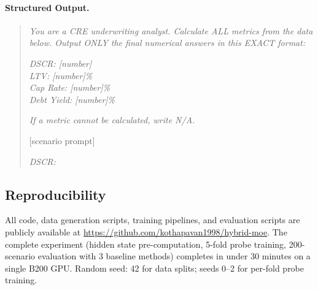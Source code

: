 \paragraph{Structured Output.}
\begin{quote}
\small
\textit{You are a CRE underwriting analyst. Calculate ALL metrics from
the data below. Output ONLY the final numerical answers in this EXACT
format:}

\textit{DSCR: [number]}\\
\textit{LTV: [number]\%}\\
\textit{Cap Rate: [number]\%}\\
\textit{Debt Yield: [number]\%}

\textit{If a metric cannot be calculated, write N/A.}

[scenario prompt]

\textit{DSCR:}
\end{quote}

\subsection{Reproducibility}
\label{sec:appendix:reproduce}

All code, data generation scripts, training pipelines, and evaluation
scripts are publicly available at
\url{https://github.com/kothapavan1998/hybrid-moe}. The complete
experiment (hidden state pre-computation, 5-fold probe training,
200-scenario evaluation with 3 baseline methods) completes in under
30 minutes on a single B200 GPU. Random seed: 42 for data splits;
seeds 0--2 for per-fold probe training.
